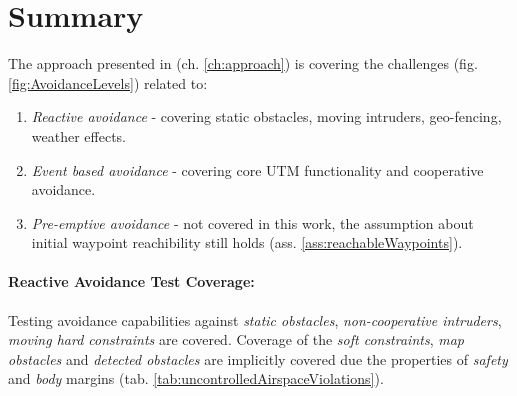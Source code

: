 \section{Summary}\label{s:conclusionSummary}
\noindent The approach presented in (ch. \ref{ch:approach}) is covering the challenges (fig. \ref{fig:AvoidanceLevels}) related to:

\begin{enumerate}
    \item \emph{Reactive avoidance} - covering static obstacles, moving intruders, geo-fencing, weather effects.
    
    \item \emph{Event based avoidance} - covering core UTM functionality and cooperative avoidance.
    
    \item \emph{Pre-emptive avoidance} - not covered in this work, the assumption about initial waypoint reachibility still holds (ass. \ref{ass:reachableWaypoints}).
\end{enumerate}

\paragraph{Reactive Avoidance Test Coverage:} Testing avoidance capabilities against \emph{static obstacles}, \emph{non-cooperative intruders}, \emph{moving hard constraints} are covered. Coverage of the \emph{soft constraints}, \emph{map obstacles} and \emph{detected obstacles} are implicitly covered due the properties of \emph{safety} and \emph{body} margins (tab. \ref{tab:uncontrolledAirspaceViolations}).
    
